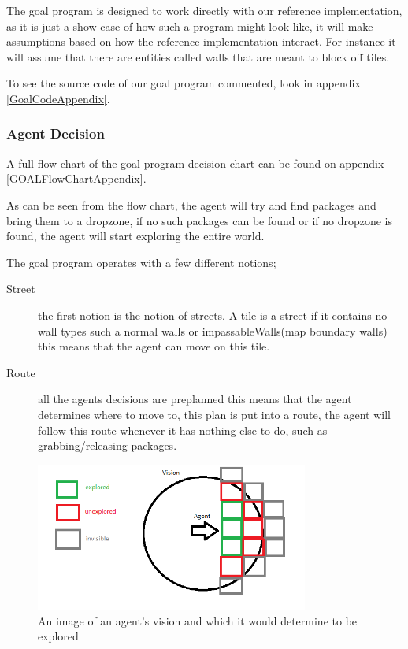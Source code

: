 The goal program is designed to work directly with our reference implementation,
as it is just a show case of how such a program might look like, it
will make assumptions based on how the reference implementation interact.
For instance it will assume that there are entities called walls that
are meant to block off tiles. 

To see the source code of our goal program commented, look in appendix
\ref{GoalCodeAppendix}.


\subsubsection{Agent Decision}

A full flow chart of the goal program decision chart can be found
on appendix \ref{GOALFlowChartAppendix}.

As can be seen from the flow chart, the agent will try and find packages
and bring them to a dropzone, if no such packages can be found or
if no dropzone is found, the agent will start exploring the entire
world.

The goal program operates with a few different notions; 
\begin{description}
\item [{Street}] the first notion is the notion of streets. A tile is a
street if it contains no wall types such a normal walls or impassableWalls(map
boundary walls) this means that the agent can move on this tile.
\item [{Route}] all the agents decisions are preplanned this means that
the agent determines where to move to, this plan is put into a route,
the agent will follow this route whenever it has nothing else to do,
such as grabbing/releasing packages.
\end{description}
\begin{figure}
\begin{centering}
\includegraphics[width=0.8\textwidth]{VisionExploredGOALAgent}
\par\end{centering}

\caption{An image of an agent\textquoteright{}s vision and which it would determine
to be explored\label{fig:VisionExploredGoalAgent}}
\end{figure}

